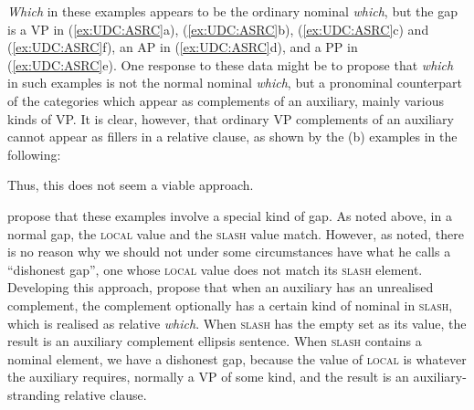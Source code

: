 \documentclass[output=paper,biblatex,babelshorthands,newtxmath,draftmode,colorlinks,citecolor=brown]{langscibook}
\begin{document}
\noindent
\emph{Which} in these examples appears to be the ordinary nominal
\emph{which}, but the gap is a VP in (\ref{ex:UDC:ASRC}a), (\ref{ex:UDC:ASRC}b), (\ref{ex:UDC:ASRC}c) and (\ref{ex:UDC:ASRC}f), an AP in
(\ref{ex:UDC:ASRC}d), and a PP in (\ref{ex:UDC:ASRC}e). One response to these data might be to propose
that \emph{which} in such examples is not the normal nominal
\emph{which}, but a pronominal counterpart of the categories which appear
as complements of an auxiliary, mainly various kinds of VP. It is clear,
however, that ordinary VP complements of an auxiliary cannot appear as
fillers in a relative clause, as shown by the (b) examples in the
following:

\begin{exe} \ex \begin{xlist} 

\end{xlist}
\end{exe}

\begin{exe} \ex \begin{xlist} 

\end{xlist}
\end{exe}
\noindent
\begin{exe} \ex \begin{xlist} 

\end{xlist}
\end{exe}

\noindent
Thus, this does not seem a viable approach.

\citet{Arnold:Borsley:10} propose that these examples involve a special
kind of gap. As noted above, in a normal gap, the \textsc{local} value and the
\textsc{slash} value match. However, as \citet{webelhuth08} noted, there is no
reason why we should not under some circumstances have what he calls a
``dishonest gap'', one whose \textsc{local} value
does not match its  \textsc{slash} element.
Developing this approach, \citet{Arnold:Borsley:10} propose that when an
auxiliary has an unrealised complement, the complement optionally has a
certain kind of nominal in \textsc{slash}, which is realised as
relative \emph{which}. When \textsc{slash} has the empty set as its value, the
result is an auxiliary complement ellipsis sentence. When \textsc{slash} contains a nominal element, we have a dishonest gap, because the value of \textsc{local} is
whatever the auxiliary requires, normally a VP of some kind, and the
result is an auxiliary-stranding relative clause.
\end{document}
